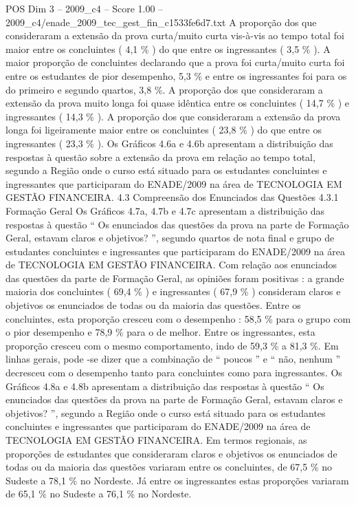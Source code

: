 \begin{textsample}{POS Dim 3 – 2009\_c4 – Score 1.00 – 2009\_c4/enade\_2009\_tec\_gest\_fin\_c1533fe6d7.txt}
A proporção dos que consideraram a extensão da prova curta/muito curta vis-à-vis ao tempo total foi maior entre os concluintes ( 4,1 \% ) do que entre os ingressantes ( 3,5 \% ).
A maior proporção de concluintes declarando que a prova foi curta/muito curta foi entre os estudantes de pior desempenho, 5,3 \% e entre os ingressantes foi para os do primeiro e segundo quartos, 3,8 \%.
A proporção dos que consideraram a extensão da prova muito longa foi quase idêntica entre os concluintes ( 14,7 \% ) e ingressantes ( 14,3 \% ).
A proporção dos que consideraram a extensão da prova longa foi ligeiramente maior entre os concluintes ( 23,8 \% ) do que entre os ingressantes ( 23,3 \% ).
Os Gráficos 4.6a e 4.6b apresentam a distribuição das respostas à questão sobre a extensão da prova em relação ao tempo total, segundo a Região onde o curso está situado para os estudantes concluintes e ingressantes que participaram do ENADE/2009 na área de TECNOLOGIA EM GESTÃO FINANCEIRA. 4.3 Compreensão dos Enunciados das Questões 4.3.1 Formação Geral Os Gráficos 4.7a, 4.7b e 4.7c apresentam a distribuição das respostas à questão “ Os enunciados das questões da prova na parte de Formação Geral, estavam claros e objetivos? ”, segundo quartos de nota final e grupo de estudantes concluintes e ingressantes que participaram do ENADE/2009 na área de TECNOLOGIA EM GESTÃO FINANCEIRA.
Com relação aos enunciados das questões da parte de Formação Geral, as opiniões foram positivas : a grande maioria dos concluintes ( 69,4 \% ) e ingressantes ( 67,9 \% ) consideram claros e objetivos os enunciados de todas ou da maioria das questões.
Entre os concluintes, esta proporção cresceu com o desempenho : 58,5 \% para o grupo com o pior desempenho e 78,9 \% para o de melhor.
Entre os ingressantes, esta proporção cresceu com o mesmo comportamento, indo de 59,3 \% a 81,3 \%.
Em linhas gerais, pode -se dizer que a combinação de “ poucos ” e “ não, nenhum ” decresceu com o desempenho tanto para concluintes como para ingressantes.
Os Gráficos 4.8a e 4.8b apresentam a distribuição das respostas à questão “ Os enunciados das questões da prova na parte de Formação Geral, estavam claros e objetivos? ”, segundo a Região onde o curso está situado para os estudantes concluintes e ingressantes que participaram do ENADE/2009 na área de TECNOLOGIA EM GESTÃO FINANCEIRA.
Em termos regionais, as proporções de estudantes que consideraram claros e objetivos os enunciados de todas ou da maioria das questões variaram entre os concluintes, de 67,5 \% no Sudeste a 78,1 \% no Nordeste.
Já entre os ingressantes estas proporções variaram de 65,1 \% no Sudeste a 76,1 \% no Nordeste.

\end{textsample}
